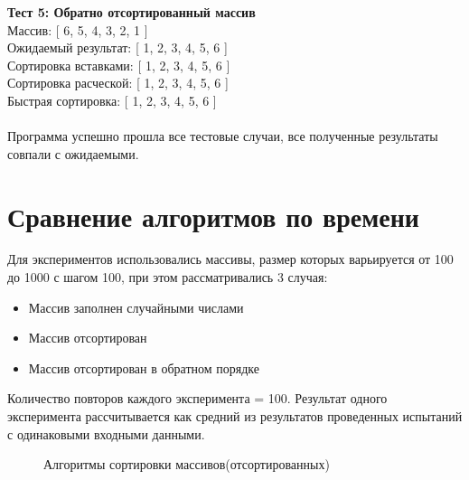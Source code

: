 \documentclass[a4paper,12pt]{report}
\begin{document}
\textbf {Тест 5: Обратно отсортированный массив}\\
Массив: [ 6, 5, 4, 3, 2, 1 ]\\
Ожидаемый результат: [ 1, 2, 3, 4, 5, 6 ]\\
Сортировка вставками: [ 1, 2, 3, 4, 5, 6 ]\\
Сортировка расческой: [ 1, 2, 3, 4, 5, 6 ]\\
Быстрая сортировка: [ 1, 2, 3, 4, 5, 6 ]\\\\

Программа успешно прошла все тестовые случаи, все полученные результаты совпали с ожидаемыми.

\section{Сравнение алгоритмов по времени}
\hspace{0.6cm}Для экспериментов использовались массивы, размер которых варьируется от 100 до 1000 с шагом 100, при этом рассматривались 3 случая:
\begin{itemize}
\item Массив заполнен случайными числами
\item Массив отсортирован
\item Массив отсортирован в обратном порядке
\end{itemize}
    Количество повторов каждого эксперимента = 100. Результат одного эксперимента рассчитывается как средний из результатов проведенных испытаний с одинаковыми входными данными.
    

\begin{figure}[ht!]
\begin{center}
\caption{Алгоритмы сортировки массивов(отсортированных)}
\end{center}
\end{figure}
\end{document}

